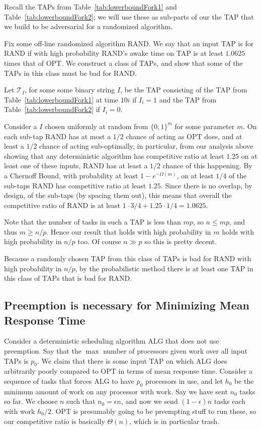 Recall the TAPs from Table~\ref{tab:lowerboundFork1} and
Table~\ref{tab:lowerboundFork2}; we will use these as sub-parts
of our the TAP that we build to be adversarial for a randomized
algorithm. 

Fix some off-line randomized algorithm RAND. We say that an input
TAP is  for RAND if with high probability RAND's awake
time on TAP is at least $1.0625$ times that of OPT.
We construct a class of TAPs, and show that some of the TAPs in
this class must be bad for RAND.

Let $\mathcal{T}_{I}$, for some some binary string $I$, be the
TAP consisting of the TAP from Table~\ref{tab:lowerboundFork1} at
time $10i$ if $I_i = 1$ and the TAP from
Table~\ref{tab:lowerboundFork2} if $I_i = 0$. 

Consider a $I$ chosen uniformly at random from $\{0,1\}^m$ for
some parameter $m$.
On each sub-tap RAND has at most a $1/2$ chance of acting as OPT
does, and at least a $1/2$ chance of acting sub-optimally, in
particular, from our analysis above showing that any deterministic
algorithm has competitive ratio at least $1.25$ on at least one
of these inputs, RAND has at least a $1/2$ chance of this
happening.
By a Chernoff Bound, with probability at least
$1-e^{-\Omega(m)}$, on at least $1/4$ of the sub-taps RAND has
competitive ratio at least $1.25$. Since there is no overlap, by
design, of the sub-taps (by spacing them out), this means that
overall the competitive ratio of RAND is at least $1\cdot 3/4 +
1.25 \cdot 1/4 = 1.0625.$

Note that the number of tasks in such a TAP is less than $mp$, so
$n \le mp$, and thus $m \ge n/p$.
Hence our result that holds with high probability in $m$ holds
with high probability in $n/p$ too.
Of course $n\gg p$ so this is pretty decent.

Because a randomly chosen TAP from this class of TAPs is bad for
RAND with high probability in $n/p$, by the probabilistic method
there is at least one TAP in this class of TAPs that is bad for
RAND. 

\subsection{Preemption is necessary for Minimizing Mean Response Time}

Consider a deterministic scheduling algorithm ALG that does not
use preemption. Say that the $\max$ number of processors given
work over all input TAPs is $p_0$. We claim that there is some
input TAP on which ALG does arbitrarily poorly compared to OPT in
terms of mean response time.
Consider a sequence of tasks that forces ALG to have $p_0$
processors in use, and let $h_0$ be the minimum amount of work on
any processor with work. Say we have sent $n_0$ tasks so far.
We choose $n$ such that $n_0 = \epsilon n$, and now we send
$(1-\epsilon)n$ tasks each with work $h_0/2$. OPT is presumably
going to be preempting stuff to run these, so our competitive
ratio is basically $\Theta(n)$, which is in particular trash.


